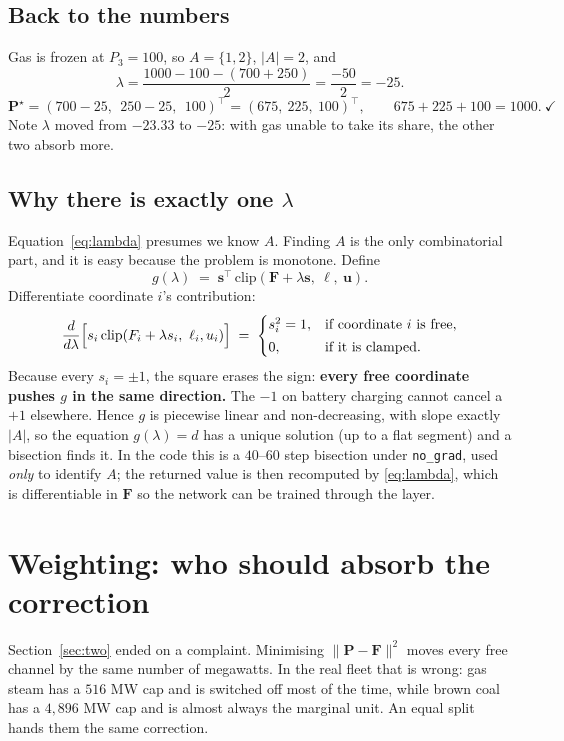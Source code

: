 \documentclass[11pt]{article}
\newcommand{\s}{\mathbf{s}}
\newcommand{\F}{\mathbf{F}}
\newcommand{\Pv}{\mathbf{P}}
\newcommand{\lo}{\bm{\ell}}
\newcommand{\hi}{\mathbf{u}}
\begin{document}
\subsection*{Back to the numbers}

Gas is frozen at $P_3 = 100$, so $A = \{1,2\}$, $\lvert A\rvert = 2$, and
\[
  \lambda = \frac{1000 - 100 - (700+250)}{2} = \frac{-50}{2} = -25 .
\]
\[
  \Pv^\star = (700-25,\ \ 250-25,\ \ 100)^{\!\top} = (675,\ 225,\ 100)^{\!\top},
  \qquad 675+225+100 = 1000 .\ \checkmark
\]
Note $\lambda$ moved from $-23.33$ to $-25$: with gas unable to take its share,
the other two absorb more.

\subsection*{Why there is exactly one $\lambda$}

Equation~\eqref{eq:lambda} presumes we know $A$. Finding $A$ is the only
combinatorial part, and it is easy because the problem is monotone. Define
\[
  g(\lambda) \;=\; \s^{\!\top}\,\mathrm{clip}(\F + \lambda\s,\ \lo,\ \hi).
\]
Differentiate coordinate $i$'s contribution:
\[
  \frac{d}{d\lambda}\Bigl[s_i\,\mathrm{clip}(F_i + \lambda s_i,\ \ell_i, u_i)\Bigr]
  \;=\;
  \begin{cases}
    s_i^2 = 1, & \text{if coordinate $i$ is free,}\\[2pt]
    0, & \text{if it is clamped.}
  \end{cases}
\]
Because every $s_i = \pm 1$, the square erases the sign: \textbf{every free
coordinate pushes $g$ in the same direction.} The $-1$ on battery charging
cannot cancel a $+1$ elsewhere. Hence $g$ is piecewise linear and
non-decreasing, with slope exactly $\lvert A\rvert$, so the equation
$g(\lambda) = d$ has a unique solution (up to a flat segment) and a bisection
finds it. In the code this is a $40$--$60$ step bisection under
\texttt{no\_grad}, used \emph{only} to identify $A$; the returned value is then
recomputed by \eqref{eq:lambda}, which is differentiable in $\F$ so the network
can be trained through the layer.

\section{Weighting: who should absorb the correction}
\label{sec:weights}

Section~\ref{sec:two} ended on a complaint. Minimising
$\lVert\Pv-\F\rVert^2$ moves every free channel by the same number of megawatts.
In the real fleet that is wrong: gas steam has a $516$ MW cap and is switched off
most of the time, while brown coal has a $4{,}896$ MW cap and is almost always
the marginal unit. An equal split hands them the same correction.
\end{document}
